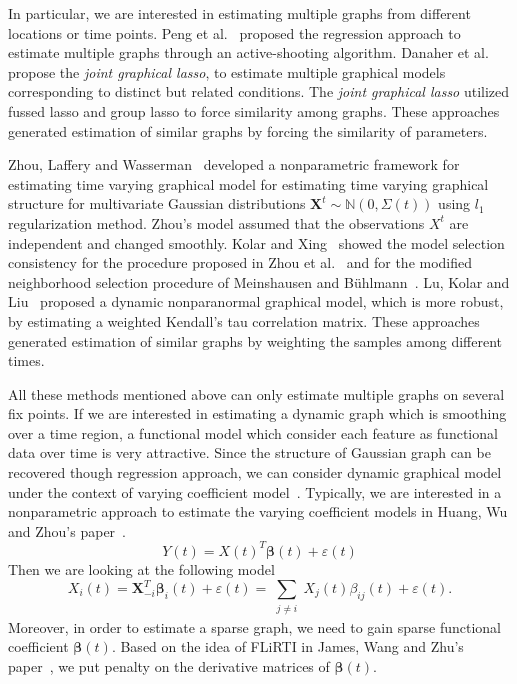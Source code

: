 \documentclass[11pt]{article}
\newcommand{\N}{\mathbb N}
\newcommand{\bX}{\mathbf X}
\newcommand{\bbeta}{{\boldsymbol{\beta}}}
\begin{document}
In particular, we are interested in estimating multiple graphs from different locations or time points. Peng et al.~\cite{peng2012partial} proposed the regression approach to estimate multiple graphs through an active-shooting algorithm. Danaher et al.~\cite{danaher2014joint} propose the \emph{joint graphical lasso}, to estimate multiple graphical models corresponding to distinct but related conditions. The \emph{joint graphical lasso} utilized fussed lasso and group lasso to force similarity among graphs. These approaches generated estimation of similar graphs by forcing the similarity of parameters.

Zhou, Laffery and Wasserman~\cite{zhou2010time} developed a nonparametric framework for estimating time varying graphical model for estimating time varying graphical structure for multivariate Gaussian distributions $\bX^t \sim \N(0, \Sigma(t))$ using $ l_1 $ regularization method. Zhou's model assumed that the observations $X^t$ are independent and changed smoothly. Kolar and Xing~\cite{kolar2011time} showed the model selection consistency for the procedure proposed in Zhou et al.~\cite{zhou2010time} and for the modified neighborhood selection procedure of Meinshausen and B{\"u}hlmann~\cite{meinshausen2006high}. Lu, Kolar and Liu~\cite{lu2015post} proposed a dynamic nonparanormal graphical model, which is more robust, by estimating a weighted Kendall's tau correlation matrix. These approaches generated estimation of similar graphs by weighting the samples among different times.

All these methods mentioned above can only estimate multiple graphs on several fix points. If we are interested in estimating a dynamic graph which is smoothing over a time region, a functional model which consider each feature as functional data over time is very attractive. Since the structure of Gaussian graph can be recovered though regression approach, we can consider dynamic graphical model under the context of varying coefficient model~\cite{hastie1993varying, fan1999statistical, fan2008statistical}. Typically, we are interested in a nonparametric approach to estimate the varying coefficient models in Huang, Wu and Zhou's paper~\cite{huang2002varying}. 
$$ Y(t) = X(t)^T \bbeta(t) + \varepsilon(t) $$
Then we are looking at the following model
$$ X_i(t) = \bX_{-i}^T \bbeta_i(t) + \varepsilon(t) = \sum_{\substack{j\neq i}} X_j(t) \beta_{ij}(t) + \varepsilon(t). $$
Moreover, in order to estimate a sparse graph, we need to gain sparse functional coefficient $\bbeta(t)$. Based on the idea of FLiRTI in James, Wang and Zhu's paper~\cite{james2009functional}, we put penalty on the derivative matrices of $\bbeta(t)$.  
\end{document}

